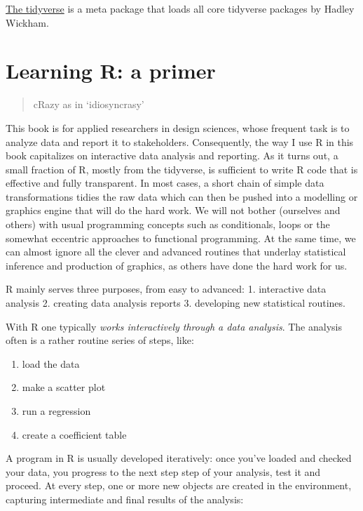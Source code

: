 \documentclass[]{svmono}
\providecommand{\tightlist}{%
  \setlength{\itemsep}{0pt}\setlength{\parskip}{0pt}}
\begin{document}
\href{http://tidyverse.org/}{The tidyverse} is a meta package that loads
all core tidyverse packages by Hadley Wickham.

\section{Learning R: a primer}\label{learning-r-a-primer}

\begin{quote}
cRazy as in `idiosyncrasy'
\end{quote}

This book is for applied researchers in design sciences, whose frequent
task is to analyze data and report it to stakeholders. Consequently, the
way I use R in this book capitalizes on interactive data analysis and
reporting. As it turns out, a small fraction of R, mostly from the
tidyverse, is sufficient to write R code that is effective and fully
transparent. In most cases, a short chain of simple data transformations
tidies the raw data which can then be pushed into a modelling or
graphics engine that will do the hard work. We will not bother
(ourselves and others) with usual programming concepts such as
conditionals, loops or the somewhat eccentric approaches to functional
programming. At the same time, we can almost ignore all the clever and
advanced routines that underlay statistical inference and production of
graphics, as others have done the hard work for us.

R mainly serves three purposes, from easy to advanced: 1. interactive
data analysis 2. creating data analysis reports 3. developing new
statistical routines.

With R one typically \emph{works interactively through a data analysis}.
The analysis often is a rather routine series of steps, like:

\begin{enumerate}
\def\labelenumi{\arabic{enumi}.}
\tightlist
\item
  load the data
\item
  make a scatter plot
\item
  run a regression
\item
  create a coefficient table
\end{enumerate}

A program in R is usually developed iteratively: once you've loaded and
checked your data, you progress to the next step step of your analysis,
test it and proceed. At every step, one or more new objects are created
in the environment, capturing intermediate and final results of the
analysis:
\end{document}

